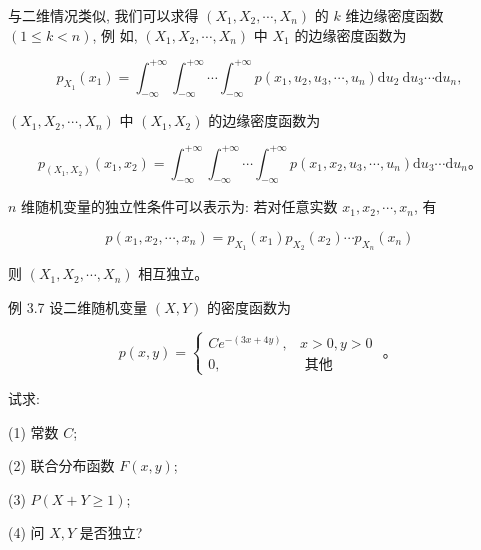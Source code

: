 \documentclass{beamer}
\begin{document}
	\begin{frame}
		与二维情况类似, 我们可以求得 $\left(X_{1}, X_{2}, \cdots, X_{n}\right)$ 的 $k$ 维边缘密度函数 $(1 \leqslant k<n)$, 例 如, $\left(X_{1}, X_{2}, \cdots, X_{n}\right)$ 中 $X_{1}$ 的边缘密度函数为
		
		$$
		p_{X_{1}}\left(x_{1}\right)=\int_{-\infty}^{+\infty} \int_{-\infty}^{+\infty} \cdots \int_{-\infty}^{+\infty} p\left(x_{1}, u_{2}, u_{3}, \cdots, u_{n}\right) \mathrm{d} u_{2} \mathrm{~d} u_{3} \cdots \mathrm{d} u_{n},
		$$
		
		$\left(X_{1}, X_{2}, \cdots, X_{n}\right)$ 中 $\left(X_{1}, X_{2}\right)$ 的边缘密度函数为
		
		$$
		p_{\left(X_{1}, X_{2}\right)}\left(x_{1}, x_{2}\right)=\int_{-\infty}^{+\infty} \int_{-\infty}^{+\infty} \cdots \int_{-\infty}^{+\infty} p\left(x_{1}, x_{2}, u_{3},\cdots, u_{n}\right) \mathrm{d} u_{3} \cdots \mathrm{d} u_{n} 。
		$$
		
		$n$ 维随机变量的独立性条件可以表示为: 若对任意实数 $x_{1}, x_{2}, \cdots, x_{n}$, 有
		
		$$
		p\left(x_{1}, x_{2}, \cdots, x_{n}\right)=p_{X_{1}}\left(x_{1}\right) p_{X_{2}}\left(x_{2}\right) \cdots p_{X_{n}}\left(x_{n}\right)
		$$
		
		则 $\left(X_{1}, X_{2}, \cdots, X_{n}\right)$ 相互独立。
	\end{frame}
	
	\begin{frame}
		例 3.7 设二维随机变量 $(X, Y)$ 的密度函数为
		
		$$
		p(x, y)=\left\{\begin{array}{cc}
			C e^{-(3 x+4 y)}, & x>0, y>0 \\
			0, & \text { 其他 }
		\end{array}\right. \text { 。 }
		$$
		
		试求:
		
		(1) 常数 $C$;
		
		(2) 联合分布函数 $F(x, y)$;
		
		(3) $P(X+Y \geqslant 1)$;
		
		(4) 问 $X, Y$ 是否独立?
	\end{frame}
	
\end{document}
